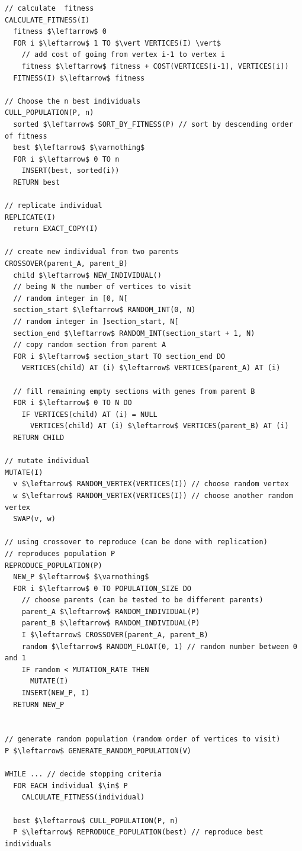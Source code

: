 \documentclass[article, a4paper, 12pt, oneside]{memoir}
\begin{document}
\begin{lstlisting}[frame=single, mathescape=true]
// calculate  fitness
CALCULATE_FITNESS(I)
  fitness $\leftarrow$ 0
  FOR i $\leftarrow$ 1 TO $\vert VERTICES(I) \vert$
    // add cost of going from vertex i-1 to vertex i
    fitness $\leftarrow$ fitness + COST(VERTICES[i-1], VERTICES[i])
  FITNESS(I) $\leftarrow$ fitness

// Choose the n best individuals
CULL_POPULATION(P, n)
  sorted $\leftarrow$ SORT_BY_FITNESS(P) // sort by descending order of fitness
  best $\leftarrow$ $\varnothing$
  FOR i $\leftarrow$ 0 TO n
    INSERT(best, sorted(i))
  RETURN best

// replicate individual
REPLICATE(I)
  return EXACT_COPY(I)

// create new individual from two parents
CROSSOVER(parent_A, parent_B)
  child $\leftarrow$ NEW_INDIVIDUAL()
  // being N the number of vertices to visit
  // random integer in [0, N[
  section_start $\leftarrow$ RANDOM_INT(0, N)
  // random integer in ]section_start, N[
  section_end $\leftarrow$ RANDOM_INT(section_start + 1, N)
  // copy random section from parent A
  FOR i $\leftarrow$ section_start TO section_end DO
    VERTICES(child) AT (i) $\leftarrow$ VERTICES(parent_A) AT (i)

  // fill remaining empty sections with genes from parent B
  FOR i $\leftarrow$ 0 TO N DO
    IF VERTICES(child) AT (i) = NULL
      VERTICES(child) AT (i) $\leftarrow$ VERTICES(parent_B) AT (i)
  RETURN CHILD

// mutate individual
MUTATE(I)
  v $\leftarrow$ RANDOM_VERTEX(VERTICES(I)) // choose random vertex
  w $\leftarrow$ RANDOM_VERTEX(VERTICES(I)) // choose another random vertex
  SWAP(v, w)

// using crossover to reproduce (can be done with replication)
// reproduces population P
REPRODUCE_POPULATION(P)
  NEW_P $\leftarrow$ $\varnothing$
  FOR i $\leftarrow$ 0 TO POPULATION_SIZE DO
    // choose parents (can be tested to be different parents)
    parent_A $\leftarrow$ RANDOM_INDIVIDUAL(P)
    parent_B $\leftarrow$ RANDOM_INDIVIDUAL(P)
    I $\leftarrow$ CROSSOVER(parent_A, parent_B)
    random $\leftarrow$ RANDOM_FLOAT(0, 1) // random number between 0 and 1
    IF random < MUTATION_RATE THEN
      MUTATE(I)
    INSERT(NEW_P, I)
  RETURN NEW_P


// generate random population (random order of vertices to visit)
P $\leftarrow$ GENERATE_RANDOM_POPULATION(V)

WHILE ... // decide stopping criteria
  FOR EACH individual $\in$ P
    CALCULATE_FITNESS(individual)

  best $\leftarrow$ CULL_POPULATION(P, n)
  P $\leftarrow$ REPRODUCE_POPULATION(best) // reproduce best individuals
\end{lstlisting}
\end{document}
